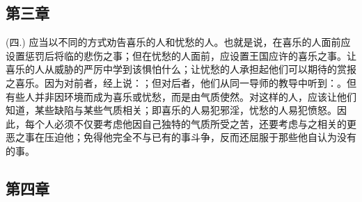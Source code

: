 
\subsection{第三章}

\par

(四.) 应当以不同的方式劝告喜乐的人和忧愁的人。也就是说，在喜乐的人面前应设置惩罚后将临的悲伤之事；但在忧愁的人面前，应设置王国应许的喜乐之事。让喜乐的人从威胁的严厉中学到该惧怕什么；让忧愁的人承担起他们可以期待的赏报之喜乐。因为对前者，经上说：；但对后者，他们从同一导师的教导中听到：。但有些人并非因环境而成为喜乐或忧愁，而是由气质使然。对这样的人，应该让他们知道，某些缺陷与某些气质相关；即喜乐的人易犯邪淫，忧愁的人易犯愤怒。因此，每个人必须不仅要考虑他因自己独特的气质所受之苦，还要考虑与之相关的更恶之事在压迫他；免得他完全不与已有的事斗争，反而还屈服于那些他自认为没有的事。\par


\subsection{第四章}

\par

